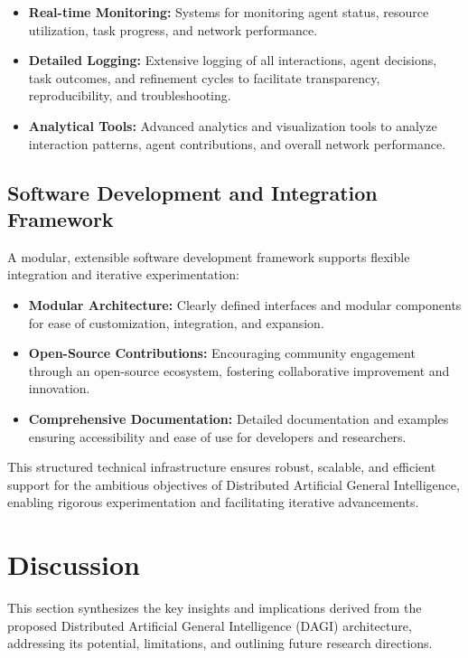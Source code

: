 \documentclass[12pt]{amsart}
\begin{document}
\begin{itemize}
    \item \textbf{Real-time Monitoring:} Systems for monitoring agent status, resource utilization, task progress, and network performance.
    \item \textbf{Detailed Logging:} Extensive logging of all interactions, agent decisions, task outcomes, and refinement cycles to facilitate transparency, reproducibility, and troubleshooting.
    \item \textbf{Analytical Tools:} Advanced analytics and visualization tools to analyze interaction patterns, agent contributions, and overall network performance.
\end{itemize}

\subsection{Software Development and Integration Framework}

A modular, extensible software development framework supports flexible integration and iterative experimentation:

\begin{itemize}
    \item \textbf{Modular Architecture:} Clearly defined interfaces and modular components for ease of customization, integration, and expansion.
    \item \textbf{Open-Source Contributions:} Encouraging community engagement through an open-source ecosystem, fostering collaborative improvement and innovation.
    \item \textbf{Comprehensive Documentation:} Detailed documentation and examples ensuring accessibility and ease of use for developers and researchers.
\end{itemize}

This structured technical infrastructure ensures robust, scalable, and efficient support for the ambitious objectives of Distributed Artificial General Intelligence, enabling rigorous experimentation and facilitating iterative advancements.


\section{Discussion}

This section synthesizes the key insights and implications derived from the proposed Distributed Artificial General Intelligence (DAGI) architecture, addressing its potential, limitations, and outlining future research directions.
\end{document}
